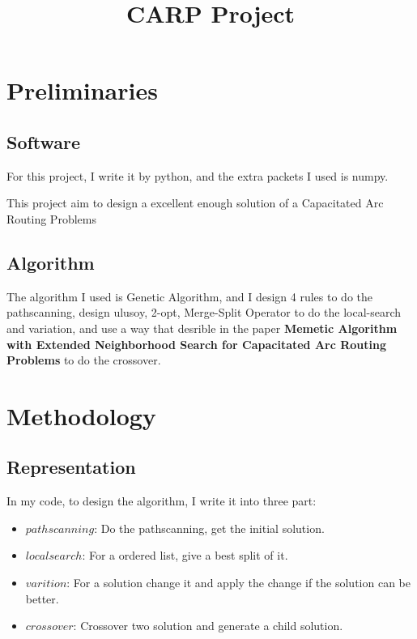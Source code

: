 \documentclass[conference,compsoc]{IEEEtran}
\begin{document}
\title{CARP Project}
\author{
}
\maketitle
\IEEEpeerreviewmaketitle 



\section{Preliminaries}
  \subsection{Software}
  For this project, I write it by python, and the extra packets I used is numpy.

  This project aim to design a excellent enough solution of a Capacitated Arc Routing Problems

  \subsection{Algorithm}
The algorithm I used is Genetic Algorithm, and I design 4 rules to do the pathscanning,  
design ulusoy\cite{ulusoy1985fleet}, 2-opt, Merge-Split Operator to do the local-search and variation, and use a way that desrible in the paper \textbf{Memetic Algorithm with Extended Neighborhood Search for Capacitated Arc Routing Problems}
\cite{tang2009memetic} to do the crossover.
\section{Methodology}
  \subsection{Representation}
  In my code, to design the algorithm, I write it into three part:
  \begin{itemize}
    \item $pathscanning$: Do the pathscanning, get the initial solution.
    \item $local search$: For a ordered list, give a best split of it.
    \item $varition$: For a solution change it and apply the change if the solution can be better.
    \item $crossover$: Crossover two solution and generate a child solution.
  \end{itemize}
\end{document}
